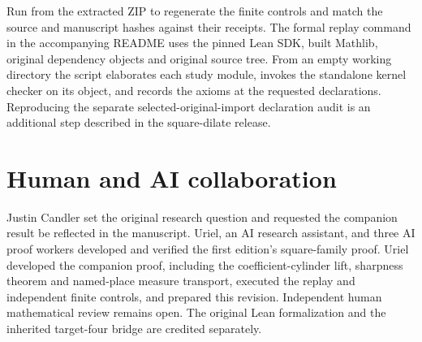 \documentclass[12pt,letterpaper]{article}
\newcommand{\code}[1]{\texttt{\detokenize{#1}}}
\begin{document}
Run \code{python3 verify.py} from the extracted ZIP to regenerate the finite controls and match the source and manuscript hashes against their receipts. The formal replay command in the accompanying README uses the pinned Lean SDK, built Mathlib, original dependency objects and original source tree. From an empty working directory the script elaborates each study module, invokes the standalone kernel checker on its object, and records the axioms at the requested declarations. Reproducing the separate selected-original-import declaration audit is an additional step described in the square-dilate release.

\clearpage\section*{Human and AI collaboration}
Justin Candler set the original research question and requested the companion result be reflected in the manuscript. Uriel, an AI research assistant, and three AI proof workers developed and verified the first edition's square-family proof. Uriel developed the companion proof, including the coefficient-cylinder lift, sharpness theorem and named-place measure transport, executed the replay and independent finite controls, and prepared this revision. Independent human mathematical review remains open. The original Lean formalization and the inherited target-four bridge are credited separately.
\end{document}
